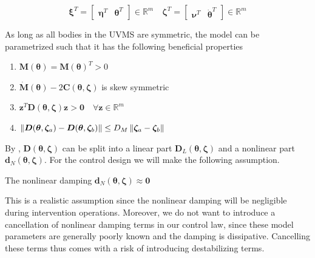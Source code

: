 \documentclass[../main.tex]{subfiles}
\begin{document}
%
\begin{equation}
    \label{eq:xi_def}
    \bm{\xi}^T = \begin{bmatrix}
        \bm{\eta}^T & \bm{\theta}^T
    \end{bmatrix} \in \mathbb{R}^{m} \quad
    \bm{\zeta}^T = \begin{bmatrix}
        \bm{\nu}^T & \dot{\bm{\theta}}^T
    \end{bmatrix} \in \mathbb{R}^{m}
\end{equation}

As long as all bodies in the UVMS are symmetric, the model can be parametrized such that it has the following beneficial properties \cite{Antonelli2018}
\label{sec:model-properties}
\begin{enumerate}
    \label{model_properties}
    \item $\bm{M}(\bm{\theta}) = \bm{M}(\bm{\theta})^T > 0$
    \label{item:M_symmetric}
    \item $\dot{\bm{M}}(\bm{\theta}) - 2\bm{C}(\bm{\theta}, \bm{\zeta})$ is skew symmetric
    \label{item:Mdot_skew_symmetric}
    \item $\bm{z}^T\bm{D}(\bm{\theta}, \bm{\zeta})\bm{z} > \bm{0} \quad \forall \bm{z}\in\mathbb{R}^m$
    \label{item:D_pos_def}
    \item \label{item:D_bounded} $\left\lVert\bm{D}(\bm{\theta}, \bm{\zeta}_a) - \bm{D}(\bm{\theta}, \bm{\zeta}_b)\right\rVert \leq D_M\left\lVert\bm{\zeta}_a - \bm{\zeta}_b\right\rVert$
\end{enumerate}

By \cite{From2014}, $\bm{D}(\bm{\theta}, \bm{\zeta})$ can be split into a linear part $\bm{D}_L(\bm{\theta},\bm{\zeta})$ and a nonlinear part $\bm{d}_N(\bm{\theta},\bm{\zeta})$. For the control design we will make the following assumption.
\begin{assumption}
    The nonlinear damping $\bm{d}_N(\bm{\theta},\bm{\zeta}) \approx \bm{0}$
\end{assumption}
\begin{remark}
    This is a realistic assumption since the nonlinear damping will be negligible during intervention operations. Moreover, we do not want to introduce a cancellation of nonlinear damping terms in our control law, since these model parameters are generally poorly known and the damping is dissipative. Cancelling these terms thus comes with a risk of introducing destabilizing terms.
\end{remark}
\end{document}

